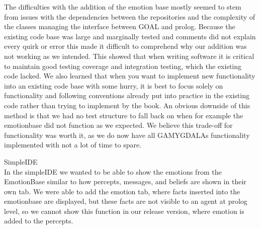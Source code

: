 \documentclass[11pt]{article}
\begin{document}
The difficulties with the addition of the emotion base mostly seemed to stem from issues with the dependencies between the repositories and the complexity of the classes managing the interface between GOAL and prolog. Because the existing code base was large and marginally tested and comments did not explain every quirk or error this made it difficult to comprehend why our addition was not working as we intended. This showed that when writing software it is critical to maintain good testing coverage and integration testing, which the existing code lacked. We also learned that when you want to implement new functionality into an existing code base with some hurry, it is best to focus solely on functionality and following conventions already put into practice in the existing code rather than trying to implement by the book. An obvious downside of this method is that we had no test structure to fall back on when for example the emotionbase did not function as we expected. We believe this trade-off for functionality was worth it, as we do now have all GAMYGDALAs functionality implemented with not a lot of time to spare.\par
SimpleIDE\\
In the simpleIDE we wanted to be able to show the emotions from the EmotionBase similar to how percepts, messages, and beliefs are shown in their own tab. We were able to add the emotion tab, where facts inserted into the emotionbase are displayed, but these facts are not visible to an agent at prolog level, so we cannot show this function in our release version, where emotion is added to the percepts.
\end{document}
